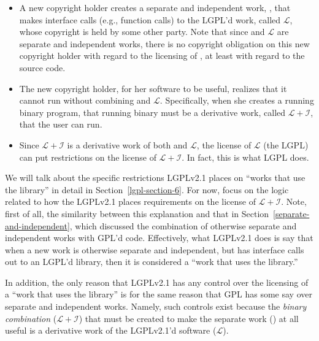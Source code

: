 \newcommand{\workl}{$\mathcal{L}$}
\newcommand{\lplusi}{$\mathcal{L\!\!+\!\!I}$}

\begin{itemize}

\item A new copyright holder creates a separate and independent work,
  \worki{}, that makes interface calls (e.g., function calls) to the
  LGPL'd work, called \workl{}, whose copyright is held by some other
  party. Note that since \worki{} and \workl{} are separate and
  independent works, there is no copyright obligation on this new copyright
  holder with regard to the licensing of \worki{}, at least with regard to
  the source code.

\item The new copyright holder, for her software to be useful, realizes
  that it cannot run without combining \worki{} and \workl{}.
  Specifically, when she creates a running binary program, that running
  binary must be a derivative work, called \lplusi{}, that the user can
  run.

\item Since \lplusi{} is a derivative work of both \worki{} and \workl{},
  the license of \workl{} (the LGPL) can put restrictions on the license
  of \lplusi{}. In fact, this is what LGPL does.

\end{itemize}

We will talk about the specific restrictions LGPLv2.1 places on ``works
that use the library'' in detail in Section~\ref{lgpl-section-6}. For
now, focus on the logic related to how the LGPLv2.1 places requirements on
the license of \lplusi{}. Note, first of all, the similarity between
this explanation and that in Section~\ref{separate-and-independent},
which discussed the combination of otherwise separate and independent
works with GPL'd code. Effectively, what LGPLv2.1 does is say that when a
new work is otherwise separate and independent, but has interface
calls out to an LGPL'd library, then it is considered a ``work that
uses the library.''

In addition, the only reason that LGPLv2.1 has any control over the licensing
of a ``work that uses the library'' is for the same reason that GPL has
some say over separate and independent works. Namely, such controls exist
because the {\em binary combination\/} (\lplusi{}) that must be created to
make the separate work (\worki{}) at all useful is a derivative work of
the LGPLv2.1'd software (\workl{}).

